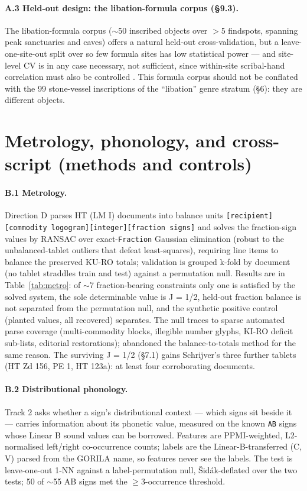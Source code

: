 \paragraph{A.3 Held-out design: the libation-formula corpus (\S9.3).} The libation-formula corpus ($\sim$50 inscribed objects over $>$5
findspots, spanning peak sanctuaries and caves) offers a natural held-out
cross-validation, but a leave-one-site-out split over so few formula sites has
low statistical power --- and site-level CV is in any case necessary, not
sufficient, since within-site scribal-hand correlation must also be controlled
\citep{salgarellajudson2024}. This formula corpus should not be conflated with
the 99 stone-vessel inscriptions of the ``libation'' genre stratum (\S6): they
are different objects.

\section{Metrology, phonology, and cross-script (methods and controls)}

\paragraph{B.1 Metrology.} Direction D parses HT (LM I) documents into
balance units \texttt{[recipient][commodity logogram][integer][fraction
signs]} and solves the fraction-sign values by RANSAC over exact-\texttt{Fraction}
Gaussian elimination (robust to the unbalanced-tablet outliers that defeat
least-squares), requiring line items to balance the preserved KU-RO totals;
validation is grouped k-fold by document (no tablet straddles train and
test) against a permutation null. Results are in Table~\ref{tab:metro}: of
$\sim$7 fraction-bearing constraints only one is satisfied by the solved
system, the sole determinable value is J = 1/2, held-out fraction balance
is not separated from the permutation null, and the synthetic positive
control (planted values, all recovered) separates. The null traces to sparse
automated parse coverage (multi-commodity blocks, illegible number glyphs,
KI-RO deficit sub-lists, editorial restorations); \citet[p.~2]{corazza2021}
abandoned the balance-to-totals method for the same reason. The surviving J
= 1/2 (\S7.1) gains Schrijver's
\citeyearpar{schrijver2014} three further tablets (HT Zd 156, PE 1, HT
123a): at least four corroborating documents.

\paragraph{B.2 Distributional phonology.} Track 2 asks whether a sign's
distributional context --- which signs sit beside it --- carries
information about its phonetic value, measured on the known \texttt{AB}
signs whose Linear B sound values can be borrowed. Features are
PPMI-weighted, L2-normalised left/right co-occurrence counts; labels are
the Linear-B-transferred (C, V) parsed from the GORILA name, so features
never see the labels. The test is leave-one-out 1-NN against a
label-permutation null, \v{S}id\'{a}k-deflated over the two tests; 50 of
$\sim$55 AB signs met the $\ge$3-occurrence threshold.

